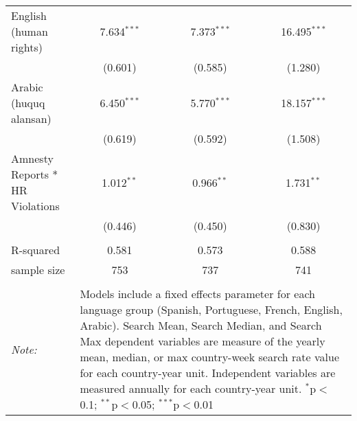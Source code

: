 \begin{table}[!htbp]
\begin{tabular}{@{\extracolsep{5pt}}lccc}
  English (human rights) & 7.634$^{***}$ & 7.373$^{***}$ & 16.495$^{***}$ \\ 
  & (0.601) & (0.585) & (1.280) \\ 
  Arabic (huquq alansan) & 6.450$^{***}$ & 5.770$^{***}$ & 18.157$^{***}$ \\ 
  & (0.619) & (0.592) & (1.508) \\ 
  Amnesty Reports * HR Violations & 1.012$^{**}$ & 0.966$^{**}$ & 1.731$^{**}$ \\ 
  & (0.446) & (0.450) & (0.830) \\ 
 \hline \\[-1.8ex] 
R-squared  & 0.581 & 0.573 & 0.588 \\ 
sample size  & 753 & 737 & 741 \\ 
\hline 
\hline \\[-1.8ex] 
\textit{Note:}  & \multicolumn{3}{l}{\parbox[t]{8cm}{Models include a fixed effects parameter for each language group (Spanish, Portuguese, French, English, Arabic). Search Mean, Search Median, and Search Max dependent variables are measure of the yearly mean, median, or max country-week search rate value for each country-year unit. Independent variables are measured annually for each country-year unit. $^{*}$p$<$0.1; $^{**}$p$<$0.05; $^{***}$p$<$0.01}} \\ 
\end{tabular} 
\end{table} 
